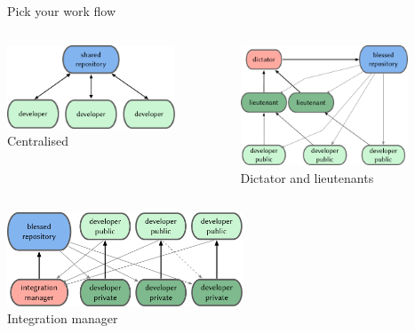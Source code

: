 \documentclass{beamer}
\begin{document}
\begin{frame}{Pick your work flow}
  \begin{columns}[c]
    \begin{column}{5cm}
      \begin{center}
        \includegraphics[width=5cm]{images/fig0501.pdf}\\Centralised
      \end{center}
    \end{column}
    \begin{column}{6cm}
      \begin{center}
        \includegraphics[width=5cm]{images/fig0503.pdf}\\Dictator and lieutenants
      \end{center}
    \end{column}
  \end{columns}
  \begin{columns}[c]
    \begin{column}{8cm}
      \begin{center}
        \includegraphics[width=7cm]{images/fig0502.pdf}\\Integration manager
      \end{center}
    \end{column}
  \end{columns}
\end{frame}
\end{document}
